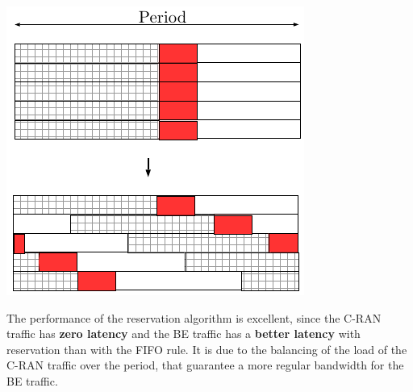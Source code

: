 \documentclass[]{algotel}
\begin{document}
    \begin{minipage}[b]{0.30\linewidth}
        \begin{center}
      \includegraphics[scale=0.55]{repart1}
      \vspace{1cm}
          \label{fig:repart2}
      \end{center} 
  \end{minipage}


  The performance of the reservation algorithm is excellent, since the C-RAN traffic has {\bf zero latency} and the BE traffic has a \textbf{better latency} with reservation than with the FIFO rule. It is due to the balancing of the load of the C-RAN traffic over the period, that guarantee a more regular bandwidth for the BE traffic.
  

  
  

\end{document}
